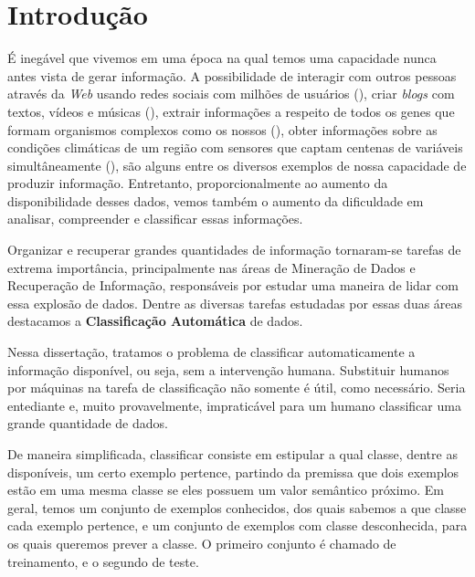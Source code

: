 \chapter{Introdução}
\label{cap::introducao}


É inegável que vivemos em uma época na qual temos uma capacidade nunca antes vista de gerar informação.
A possibilidade de interagir com outros pessoas através da \textit{Web} usando redes sociais com milhões de usuários (\cite{Thom11}), criar \textit{blogs} com textos, vídeos e músicas (\cite{Baxter10}), extrair informações a respeito de todos os genes que formam organismos complexos como os nossos (\cite{Williams01}), obter informações sobre as condições climáticas de um região com sensores que captam centenas de variáveis simultâneamente (\cite{Rotach09}), são alguns entre os diversos exemplos de nossa capacidade de produzir informação.
Entretanto, proporcionalmente ao aumento da disponibilidade desses dados, vemos também o aumento da dificuldade em analisar, compreender e classificar essas informações.

Organizar e recuperar grandes quantidades de informação tornaram-se tarefas de extrema importância, principalmente nas áreas de Mineração de Dados e Recuperação de Informação, responsáveis por estudar uma maneira de lidar com essa explosão de dados. Dentre as diversas tarefas estudadas por essas duas áreas destacamos a \textbf{Classificação Automática} de dados. 

Nessa dissertação, tratamos o problema de classificar automaticamente a informação disponível, ou seja, sem a intervenção humana. 
Substituir humanos por máquinas na tarefa de classificação não somente é útil, como necessário. 
Seria entediante e, muito provavelmente, impraticável para um humano classificar uma grande quantidade de dados.

De maneira simplificada, classificar consiste em estipular a qual classe, dentre as disponíveis, um certo exemplo 
pertence, partindo da premissa que dois exemplos estão em uma mesma classe se eles possuem um valor semântico próximo. 
Em geral, temos um conjunto de exemplos conhecidos, dos quais sabemos a que classe cada exemplo pertence, e um conjunto de exemplos com classe desconhecida, para os quais queremos prever a classe. O primeiro conjunto é chamado de treinamento, e o segundo de teste. 

